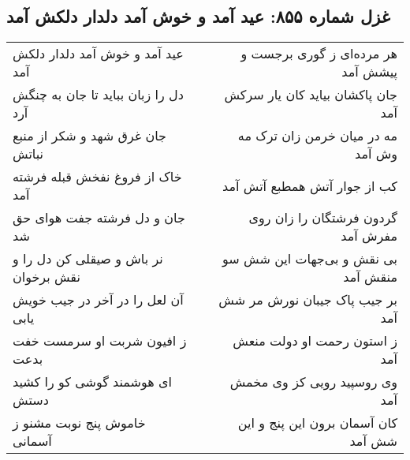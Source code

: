 \begin{center}
\section*{غزل شماره ۸۵۵: عید آمد و خوش آمد دلدار دلکش آمد}
\label{sec:0855}
\begin{longtable}{l p{0.5cm} r}
عید آمد و خوش آمد دلدار دلکش آمد
&&
هر مرده‌ای ز گوری برجست و پیشش آمد
\\
دل را زبان بباید تا جان به چنگش آرد
&&
جان پاکشان بیاید کان یار سرکش آمد
\\
جان غرق شهد و شکر از منبع نباتش
&&
مه در میان خرمن زان ترک مه وش آمد
\\
خاک از فروغ نفخش قبله فرشته آمد
&&
کب از جوار آتش همطبع آتش آمد
\\
جان و دل فرشته جفت هوای حق شد
&&
گردون فرشتگان را زان روی مفرش آمد
\\
نر باش و صیقلی کن دل را و نقش برخوان
&&
بی نقش و بی‌جهات این شش سو منقش آمد
\\
آن لعل را در آخر در جیب خویش یابی
&&
بر جیب پاک جیبان نورش مر شش آمد
\\
ز افیون شربت او سرمست خفت بدعت
&&
ز استون رحمت او دولت منعش آمد
\\
ای هوشمند گوشی کو را کشید دستش
&&
وی روسپید رویی کز وی مخمش آمد
\\
خاموش پنج نوبت مشنو ز آسمانی
&&
کان آسمان برون این پنج و این شش آمد
\\
\end{longtable}
\end{center}
